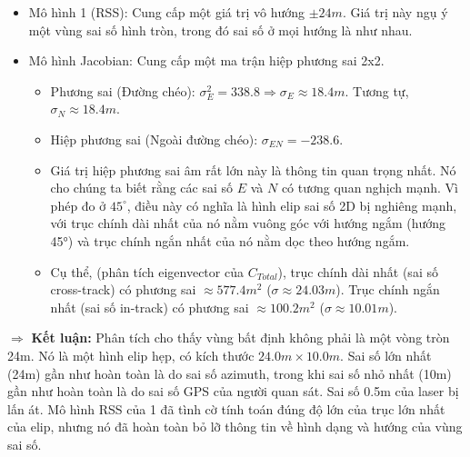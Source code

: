 \begin{itemize}
    \item Mô hình 1 (RSS): Cung cấp một giá trị vô hướng $\pm 24m$. Giá trị này ngụ ý một vùng sai số hình tròn, trong đó sai số ở mọi hướng là như nhau.
    \item Mô hình Jacobian: Cung cấp một ma trận hiệp phương sai 2x2.
    \begin{itemize}
        \item Phương sai (Đường chéo): $\sigma_E^2 = 338.8 \Rightarrow \sigma_E \approx 18.4m$. Tương tự, $\sigma_N \approx 18.4m$.
        \item Hiệp phương sai (Ngoài đường chéo): $\sigma_{EN} = -238.6$.
        \item Giá trị hiệp phương sai âm rất lớn này là thông tin quan trọng nhất. Nó cho chúng ta biết rằng các sai số $E$ và $N$ có tương quan nghịch mạnh. Vì phép đo ở $45^\circ$, điều này có nghĩa là hình elip sai số 2D bị nghiêng mạnh, với trục chính dài nhất của nó nằm vuông góc với hướng ngắm (hướng 45°) và trục chính ngắn nhất của nó nằm dọc theo hướng ngắm.
        \item Cụ thể, (phân tích eigenvector của $C_{Total}$), trục chính dài nhất (sai số cross-track) có phương sai $\approx 577.4 m^2$ ($\sigma \approx 24.03m$). Trục chính ngắn nhất (sai số in-track) có phương sai $\approx 100.2 m^2$ ($\sigma \approx 10.01m$).
    \end{itemize}
\end{itemize}
$\Rightarrow$ \textbf{Kết luận:} Phân tích cho thấy vùng bất định không phải là một vòng tròn 24m. Nó là một hình elip hẹp, có kích thước $24.0m \times 10.0m$. Sai số lớn nhất (24m) gần như hoàn toàn là do sai số azimuth, trong khi sai số nhỏ nhất (10m) gần như hoàn toàn là do sai số GPS của người quan sát. Sai số 0.5m của laser bị lấn át. Mô hình RSS của 1 đã tình cờ tính toán đúng độ lớn của trục lớn nhất của elip, nhưng nó đã hoàn toàn bỏ lỡ thông tin về hình dạng và hướng của vùng sai số.